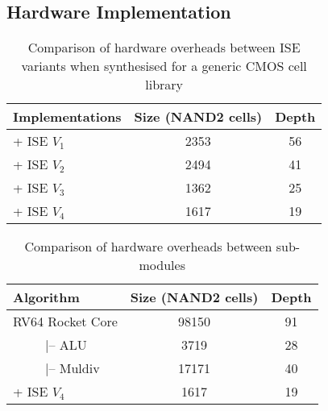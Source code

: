 \subsection{Hardware Implementation}

\begin{table}
	\caption{Comparison of hardware overheads between ISE variants when synthesised for a
		generic CMOS cell library}
	\label{tab:res:sw:hardcost1}
	\begin{tabular}{lcc}
		\toprule            
		Implementations        & Size (NAND2 cells)    & Depth  \\
		
		\midrule
		+ ISE $V_1$ &     2353     & 56   \\
		+ ISE $V_2$ &     2494     & 41   \\
		+ ISE $V_3$ &     1362     & 25   \\
		+ ISE $V_4$ &     1617     & 19   \\
		
		\bottomrule
	\end{tabular}
\end{table}

\begin{table}
	\caption{Comparison of hardware overheads between sub-modules}
	\label{tab:res:sw:hardcost2}
	\begin{tabular}{lcc}
		\toprule            
		Algorithm        &     Size (NAND2 cells)     & Depth \\
		
		\midrule
		RV64 Rocket Core &    98150     &   91  \\
		~~~~~|-- ALU     &     3719     &   28  \\
		~~~~~|-- Muldiv  &    17171     &   40  \\
		+ ISE $V_4$      &     1617     &   19  \\ 
		
		\bottomrule
	\end{tabular}
\end{table}


